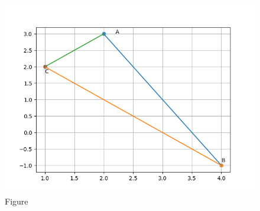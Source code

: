 \documentclass[journal,12pt,twocolumn]{IEEEtran}
\begin{document}
\begin{figure}[h!]
  \centering
   \includegraphics[width=\linewidth]{figs/figure_1.png}
   \caption{Figure}
   \label{fig:}
\end{figure}

\end{document}
